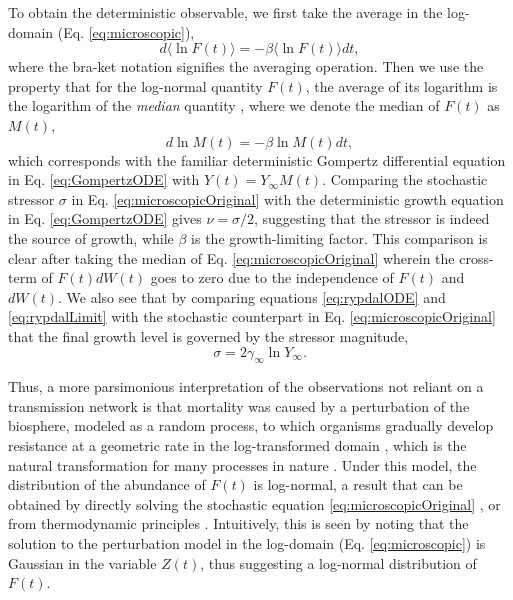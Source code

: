 \documentclass{article}
\begin{document}
To obtain the deterministic observable, we first take the average in the log-domain (Eq. \ref{eq:microscopic}), 
\begin{equation}
d\langle\ln{F(t)}\rangle = -\beta \langle\ln{F(t)}\rangle dt,
\end{equation}
where the bra-ket notation signifies the averaging operation.
Then we use the property that for the log-normal quantity $F(t)$, the average of its logarithm is the logarithm of the \emph{median} quantity \cite{petroni2020gompertz}, where we denote the median of $F(t)$ as $M(t)$, 
\begin{equation}
\label{eq:medianGomp}
d\ln{M(t)} = -\beta \ln{M(t)} dt,
\end{equation}
which corresponds with the familiar deterministic Gompertz differential equation in Eq. \ref{eq:GompertzODE} with $Y(t) = Y_\infty M(t)$. 
Comparing the stochastic stressor $\sigma$ in Eq. \ref{eq:microscopicOriginal} with the deterministic growth equation in Eq. \ref{eq:GompertzODE} gives $\nu=\sigma/2$, suggesting that the stressor is indeed the source of growth, while $\beta$ is the growth-limiting factor. This comparison is clear after taking the median of Eq. \ref{eq:microscopicOriginal} wherein the cross-term of $F(t)dW(t)$ goes to zero due to the independence of $F(t)$ and $dW(t)$.
We also see that by comparing equations \ref{eq:rypdalODE} and \ref{eq:rypdalLimit} with the stochastic counterpart in Eq. \ref{eq:microscopicOriginal} that the final growth level is governed by the stressor magnitude,
\begin{equation}
\sigma = 2\gamma_{\infty}\ln{Y_{\infty}}.
\end{equation}

Thus, a more parsimonious interpretation of the observations not reliant on a transmission network is that mortality was caused by a perturbation of the biosphere, modeled as a random process, to which organisms gradually develop resistance at a geometric rate in the log-transformed domain \cite{boxenbaum2017hypotheses,neafsey1988gompertz}, which is the natural transformation for many processes in nature \cite{zhang1994log}. 
Under this model, the distribution of the abundance of $F(t)$ is log-normal, a result that can be obtained by directly solving the stochastic equation \ref{eq:microscopicOriginal} \cite{skiadas2010exact,petroni2020gompertz}, or from thermodynamic principles \cite{sitaram1984statistical,gunasekaran1982lon,chakrabarti1996non}. 
Intuitively, this is seen by noting that the solution to the perturbation model in the log-domain (Eq. \ref{eq:microscopic}) is Gaussian in the variable $Z(t)$, thus suggesting a log-normal distribution of $F(t)$.
\end{document}
